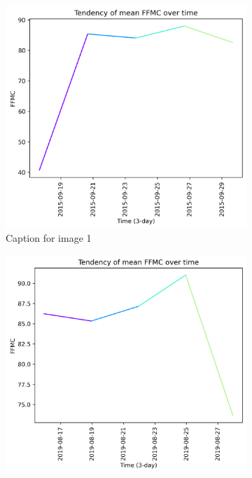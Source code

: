 \begin{figure}[h]
    \centering
    \caption{Caption for the whole figure}
    \begin{subfigure}{0.3\textwidth}
        \centering
        \includegraphics[width=\textwidth]{graphs/2015/15daysprior/2015_15daysprior_tendency_graph_FFMC.png}
        \caption{Caption for image 1}
        \label{fig:img1}
    \end{subfigure}
    \hfill
    \begin{subfigure}{0.3\textwidth}
        \centering
        \includegraphics[width=\textwidth]{graphs/2019/15daysprior/2019_15daysprior_tendency_graph_FFMC.png}

\end{subfigure}
\end{figure}
